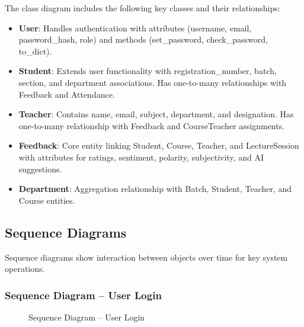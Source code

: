 The class diagram includes the following key classes and their relationships:

\begin{itemize}
    \item \textbf{User}: Handles authentication with attributes (username, email, password\_hash, role) and methods (set\_password, check\_password, to\_dict).
    \item \textbf{Student}: Extends user functionality with registration\_number, batch, section, and department associations. Has one-to-many relationships with Feedback and Attendance.
    \item \textbf{Teacher}: Contains name, email, subject, department, and designation. Has one-to-many relationship with Feedback and CourseTeacher assignments.
    \item \textbf{Feedback}: Core entity linking Student, Course, Teacher, and LectureSession with attributes for ratings, sentiment, polarity, subjectivity, and AI suggestions.
    \item \textbf{Department}: Aggregation relationship with Batch, Student, Teacher, and Course entities.
\end{itemize}

\subsection{Sequence Diagrams}

Sequence diagrams show interaction between objects over time for key system operations.

\subsubsection{Sequence Diagram -- User Login}

\begin{figure}[H]
\centering
{}
\caption{Sequence Diagram -- User Login}
\label{fig:seqlogin}
\end{figure}

